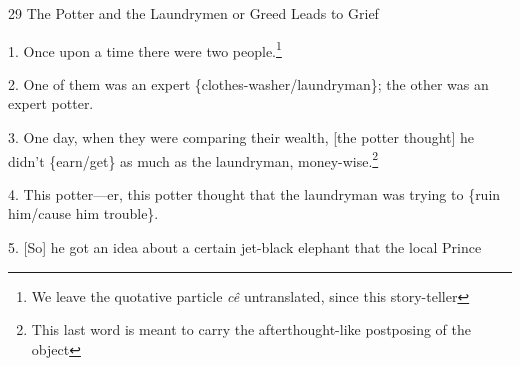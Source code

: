 
29 The Potter and the Laundrymen or Greed Leads to Grief

1. Once upon a time there were two people.\footnote{We leave the quotative particle \textit{cê} untranslated, since this story-teller}

2. One of them was an expert \{clothes-washer/laundryman\}; the other was an expert
potter.

3. One day, when they were comparing their wealth, [the potter thought] he didn't
\{earn/get\} as much as the laundryman, money-wise.\footnote{This last word is meant to carry the afterthought-like postposing of the object}

4. This potter---er, this potter thought that the laundryman was trying to \{ruin
him/cause him trouble\}.

5. [So] he got an idea about a certain jet-black elephant that the local Prince
